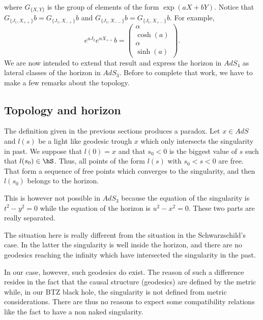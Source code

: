 	where $G_{\{ X,Y \}}$ is the group of elements of the form $\exp(aX+bY)$. Notice that $G_{\{ J_1,X_{++} \}}b=G_{\{ J_1,X_{-+} \}}b$ and $G_{\{ J_1,X_{--} \}}b=G_{\{ J_1,X_{+-} \}}b$. For example,
	\begin{equation}
		e^{aJ_2} e^{\alpha X_{++}}b=\begin{pmatrix}
			\alpha   \\
			\cosh(a) \\
			\alpha   \\
			\sinh(a)
		\end{pmatrix}.
	\end{equation}
	We are now intended to extend that result and express the horizon in $AdS_4$ as lateral classes of the horizon in $AdS_3$. Before to complete that work, we have to make a few remarks about the topology.

	\subsection{Topology and horizon}
	\label{subSecTopoHor}

	The definition given in the previous sections produces a paradox. Let $x\in AdS$ and $l(s)$ be a light like geodesic trough $x$ which only intersects the singularity in past. We suppose that $l(0)=x$ and that $s_0<0$ is the biggest value of $s$ such that $l(s_0)\in \hS$. Thus, all points of the form $l(s)$ with $s_0<s<0$ are free. That form a sequence of free points which converges to the singularity, and then $l(s_0)$ belongs to the horizon.

	This is however not possible in $AdS_3$ because the equation of the singularity is $t^2-y^2=0$ while the equation of the horizon is $u^2-x^2=0$. These two parts are really separated.

	The situation here is really different from the situation in the Schwarzschild's case. In the latter the singularity is well inside the horizon, and there are no geodesics reaching the infinity which have intersected the singularity in the past.

	In our case, however, such geodesics do exist. The reason of such a difference resides in the fact that the causal structure (geodesics) are defined by the metric while, in our BTZ black hole, the singularity is not defined from metric considerations. There are thus no reasons to expect some compatibility relations like the fact to have a non naked singularity.


